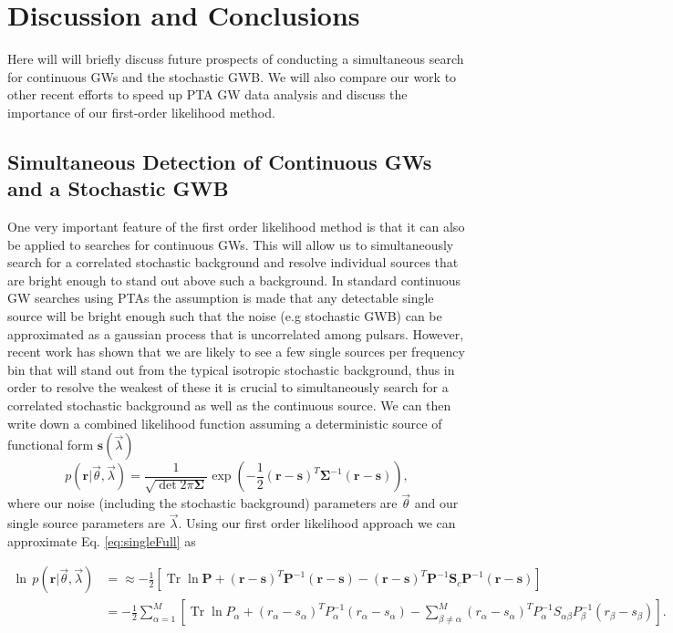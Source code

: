 \documentclass[iop]{emulateapj}
\newcommand{\be}{\begin{equation}}
\newcommand{\ee}{\end{equation}}
\newcommand{\lp}{\left(}
\newcommand{\rp}{\right)}
\DeclareMathOperator{\Tr}{Tr}
\begin{document}
\section{Discussion and Conclusions}
\label{sec:conclusions}
Here will will briefly discuss future prospects of conducting a simultaneous search for continuous GWs and the stochastic GWB. We will also compare our work to other recent efforts to speed up PTA GW data analysis and discuss the importance of our first-order likelihood method.

\subsection{Simultaneous Detection of Continuous GWs and a Stochastic GWB}

One very important feature of the first order likelihood method is that it can also be applied to searches for continuous GWs. This will allow us to simultaneously search for a correlated stochastic background and resolve individual sources that are bright enough to stand out above such a background. In standard continuous GW searches using PTAs \citep{bs12,esc12,pbs+12} the assumption is made that any detectable single source will be bright enough such that the noise (e.g stochastic GWB) can be approximated as a gaussian process that is uncorrelated among pulsars. However, recent work \citep{rwh+12} has shown that we are likely to see a few single sources per frequency bin that will stand out from the typical isotropic stochastic background, thus in order to resolve the weakest of these it is crucial to simultaneously search for a correlated stochastic background as well as the continuous source. We can then write down a combined likelihood function assuming a deterministic source of functional form $\mathbf{s}(\vec\lambda)$
\be
p(\mathbf{r}|\vec{\theta},\vec{\lambda})=\frac{1}{\sqrt{\det2\pi\boldsymbol{\Sigma}}}\exp\lp -\frac{1}{2}(\mathbf{r}-\mathbf{s})^{T}
\boldsymbol{\Sigma}^{-1}(\mathbf{r}-\mathbf{s}) \rp,
\label{eq:singleFull}
\ee
where our noise (including the stochastic background) parameters are $\vec\theta$ and our single source parameters are $\vec\lambda$. Using our first order likelihood approach we can approximate Eq. \ref{eq:singleFull} as
\begin{widetext}
\be
\begin{split}
\ln\,p(\mathbf{r}|\vec{\theta},\vec{\lambda}) &=\approx-\frac{1}{2}\left[ \Tr\ln \mathbf{P} +(\mathbf{r}-\mathbf{s})^{T}\mathbf{P}^{-1}(\mathbf{r}-\mathbf{s})-(\mathbf{r}-\mathbf{s})^{T}\mathbf{P}^{-1}\mathbf{S}_{c}\mathbf{P}^{-1}(\mathbf{r}-\mathbf{s})  \right]\\
&=-\frac{1}{2}\sum_{\alpha=1}^M \left[\Tr\ln P_{\alpha} +(r_{\alpha}-s_{\alpha})^TP_{\alpha}^{-1}(r_{\alpha}-s_{\alpha}) -\sum_{\beta\ne\alpha}^M(r_{\alpha}-s_{\alpha})^T P_{\alpha}^{-1}S_{\alpha\beta}P_{\beta}^{-1}(r_{\beta}-s_{\beta})\right].
\end{split}
\ee
\end{widetext}
\end{document}
